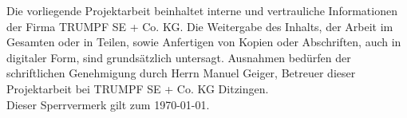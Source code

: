 
 
 
Die vorliegende Projektarbeit beinhaltet interne und vertrauliche Informationen der Firma TRUMPF SE + Co. KG. Die Weitergabe des Inhalts, der Arbeit im Gesamten oder in Teilen, sowie Anfertigen von Kopien oder Abschriften, auch in digitaler Form, sind grundsätzlich untersagt. Ausnahmen bedürfen der schriftlichen Genehmigung durch Herrn Manuel Geiger, Betreuer dieser Projektarbeit bei TRUMPF SE + Co. KG Ditzingen.
\\[2em]
Dieser Sperrvermerk gilt zum \today.
 
\newpage